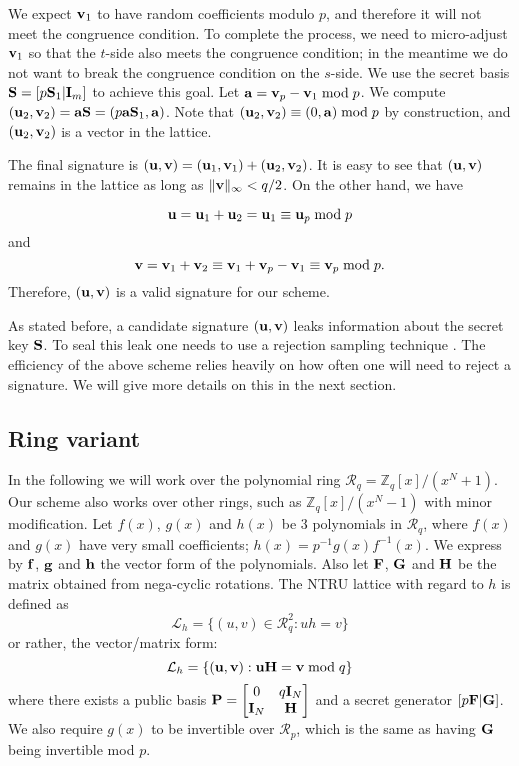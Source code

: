 \documentclass{llncs}
\newcommand{\Lcal}{{\mathcal L}}
\newcommand{\Rcal}{{\mathcal R}}
\newcommand{\ZZ}{\mathbb{Z}}
\newcommand{\bfa}{{\bf a}}
\newcommand{\bff}{{\bf f}}
\newcommand{\bfg}{{\bf g}}
\newcommand{\bfh}{{\bf h}}
\newcommand{\bfu}{{\bf u}}
\newcommand{\bfv}{{\bf v}}
\newcommand{\bfF}{{\bf F}}
\newcommand{\bfB}{{\bf B}}
\newcommand{\bfG}{{\bf G}}
\newcommand{\bfH}{{\bf H}}
\newcommand{\bfI}{{\bf I}}
\newcommand{\bfS}{{\bf S}}
\newcommand{\<}{\langle}
\renewcommand{\>}{\rangle}
\begin{document}
We expect $\bfv_1$ to have 
random coefficients modulo $p$, and therefore it will not meet the congruence condition. 
 To complete the process, we 
need to micro-adjust $\bfv_1$ so that the $t$-side also meets the congruence condition; in the meantime we do not want to break the 
congruence condition on the $s$-side.
We use the secret basis $\bfS = [p\bfS_1|\bfI_m]$ to achieve this goal. 
Let $\bfa = \bfv_p-\bfv_1 \bmod p$.
We compute $(\bfu_2,\bfv_2)= \bfa\bfS = (p\bfa\bfS_1,\bfa)$. Note that $(\bfu_2,\bfv_2)\equiv (0,\bfa) \bmod p$ by construction, and $(\bfu_2,\bfv_2)$ is a vector in the lattice.

The final signature is $(\bfu,\bfv) = (\bfu_1, \bfv_1) + (\bfu_2, \bfv_2)$. It is easy to see that $(\bfu,\bfv)$ remains in the lattice as long as $\|\bfv\|_\infty < q/2$. On the other hand, we have

\[\bfu  = \bfu_1 +\bfu_2  = \bfu_1  \equiv  \bfu_p \bmod p\]
and 
\[\bfv=\bfv_1  +\bfv_2  \equiv \bfv_1 + \bfv_p - \bfv_1 \equiv \bfv_p \bmod p .\]
Therefore, $(\bfu,\bfv)$  is a valid signature for our scheme.


\begin{remark}
As stated before, a candidate signature $(\bfu,\bfv)$ leaks information about the secret key $\bfS$. To seal this leak
one needs to use a rejection sampling technique \cite{MR2593089}.
 The efficiency of the above scheme relies heavily
on how often one will need to reject a signature.
We will give more details on this in the next section.
\end{remark}
\subsection{Ring variant}
In the following we will work over the polynomial ring $\Rcal_q = \ZZ_q[x]/(x^N + 1)$.
Our scheme also works over  other rings, such as $\ZZ_q[x]/(x^N - 1)$ with minor modification.
Let $f(x)$, $g(x)$ and $h(x)$ be $3$ polynomials in $\Rcal_q$,
where $f(x)$ and $g(x)$ have very small coefficients; $h(x) = p^{-1}g(x)f^{-1}(x)$.  We express by
$\bff$, $\bfg$  and  $\bfh$ the vector form of the polynomials. Also let $\bfF$, $\bfG$ and  $\bfH$ be the matrix  obtained from 
nega-cyclic rotations.
The NTRU lattice with regard to $h$ is defined as 
\[
\Lcal_h = \{(u,v) \in \Rcal_q^2: uh = v\}
\]
or rather, the vector/matrix form:
\[
\Lcal_h = \{(\bfu,\bfv): \bfu\bfH = \bfv \bmod q\}
\]
where there exists a public basis
$\bf P  = \begin{bmatrix}
0& q\bfI_N \\
\bfI_N& \bfH 
\end{bmatrix}
$
and a secret generator
$
[p\bfF|\bfG]
$. We also require $g(x)$ to be invertible over $\Rcal_p$,
which is the same as  having $\bfG$ being invertible mod $p$.
\end{document}
